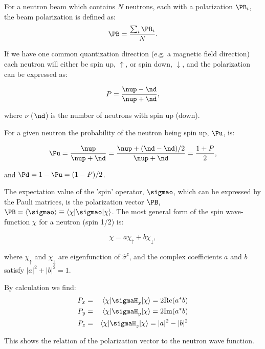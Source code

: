 For a neutron beam which contains $N$ neutrons, each with a
polarization $\PB_i$, the beam polarization is defined as:
\begin{equation}
  \label{eq:pol_beam}
  \PB = \frac{\sum_i \PB_i}{N}.
\end{equation}

If we have one common quantization direction (e.g. a magnetic field
direction) each neutron will either be spin up, $\uparrow$, or spin down,
$\downarrow$, and the polarization can be expressed as:

\begin{equation}
  \label{eq:pol}
  P = \frac{\nup-\nd}{\nup+\nd},
\end{equation}

where $\nu$ ($\nd$) is the number of neutrons with spin up
(down).

For a given neutron the probability of the neutron being spin up, $\Pu$, is:

\begin{equation}
  \label{eq:prob_spinup}
  \Pu = \frac{\nup}{\nup+\nd} = \frac{\nup + (\nd-\nd)/2}{\nup+\nd}
  = \frac{1+P}{2},
\end{equation}

and $\Pd = 1-\Pu = (1-P)/2$.

The expectation value of the 'spin' operator, $\sigmao$, which can be
expressed by the Pauli matrices, is the polarization vector $\PB$, $\PB =
\langle \sigmao \rangle \equiv \langle \chi | \sigmao | \chi \rangle$.  The
most general form of the spin wave-function $\chi$ for a neutron (spin 1/2)
is:

\begin{equation}
  \label{eq:neutron_wave}
  \chi = a\chi_\uparrow + b\chi_\downarrow,
\end{equation}

where $\chi_\uparrow$ and $\chi_\downarrow$ are eigenfunction of
$\hat{\sigma}^z$, and the complex coefficients $a$ and $b$ satisfy
$|a|^2 + |b|^2 = 1$.

By calculation we find:
\begin{eqnarray}
P_x & = & \langle \chi | \sigmaH_x | \chi \rangle
= 2 \text{Re}(a^\ast b) \\
P_y & = & \langle \chi | \sigmaH_y | \chi \rangle
= 2 \text{Im}(a^\ast b) \\
P_z & = & \langle \chi | \sigmaH_z | \chi \rangle
= |a|^2-|b|^2
\end{eqnarray}

This shows the relation of the polarization vector to the neutron wave
function.

